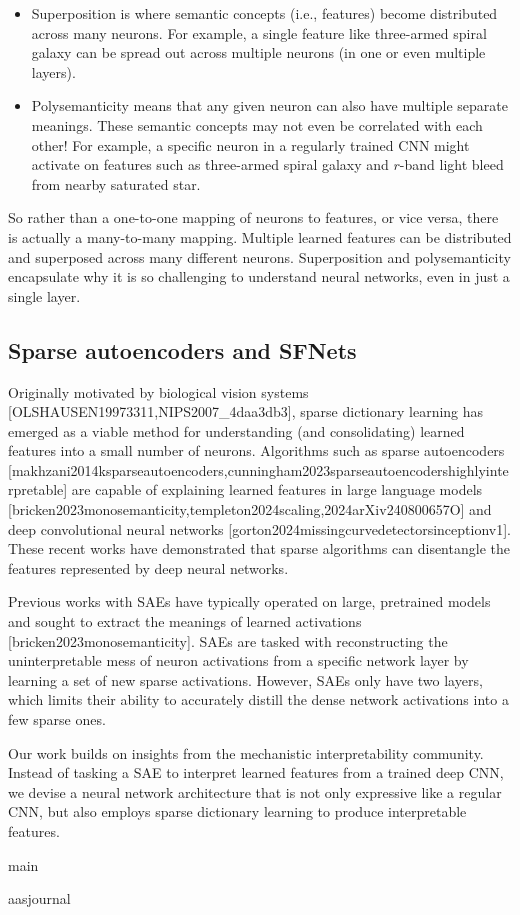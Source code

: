 \documentclass[11pt,a4paper]{article}
\begin{document}
\begin{itemize}
\item Superposition is where semantic concepts (i.e., features) become distributed across many neurons. For example, a single feature like three-armed spiral galaxy can be spread out across multiple neurons (in one or even multiple layers).
\item Polysemanticity means that any given neuron can also have multiple separate meanings. These semantic concepts may not even be correlated with each other! For example, a specific neuron in a regularly trained CNN might activate on features such as three-armed spiral galaxy and $r$-band light bleed from nearby saturated star.
\end{itemize}

So rather than a one-to-one mapping of neurons to features, or vice versa, there is actually a many-to-many mapping. Multiple learned features can be distributed and superposed across many different neurons. Superposition and polysemanticity encapsulate why it is so challenging to understand neural networks, even in just a single layer.

\subsection{Sparse autoencoders and SFNets}

Originally motivated by biological vision systems [OLSHAUSEN19973311,NIPS2007\_4daa3db3], sparse dictionary learning has emerged as a viable method for understanding (and consolidating) learned features into a small number of neurons. 
Algorithms such as sparse autoencoders [makhzani2014ksparseautoencoders,cunningham2023sparseautoencodershighlyinterpretable] are capable of explaining learned features in large language models [bricken2023monosemanticity,templeton2024scaling,2024arXiv240800657O] and deep convolutional neural networks [gorton2024missingcurvedetectorsinceptionv1].
These recent works have demonstrated that sparse algorithms can disentangle the features represented by deep neural networks.

Previous works with SAEs have typically operated on large, pretrained models and sought to extract the meanings of learned activations [bricken2023monosemanticity].
SAEs are tasked with reconstructing the uninterpretable mess of neuron activations from a specific network layer by learning a set of new sparse activations.
However, SAEs only have two layers, which limits their ability to accurately distill the dense network activations into a few sparse ones.

Our work builds on insights from the mechanistic interpretability community.
Instead of tasking a SAE to interpret learned features from a trained deep CNN, we devise a neural network architecture that is not only expressive like a regular CNN, but also employs sparse dictionary learning to produce interpretable features.

main

aasjournal
\end{document}

